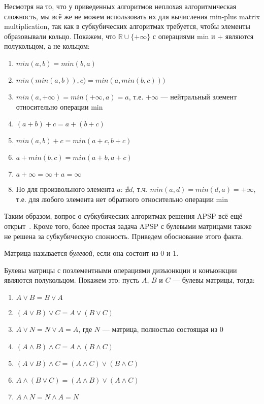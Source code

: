 Несмотря на то, что у приведенных алгоритмов неплохая алгоритмическая сложность, мы всё же не можем использовать их для вычисления min-plus matrix multiplication, так как в субкубических алгоритмах требуется, чтобы элементы образовывали кольцо. Покажем, что $\mathbb{R} \cup \{+\infty\}$ с операциями min и + являются полукольцом, а не кольцом:
\begin{enumerate}
    \item $min(a, b) = min(b, a)$
    \item $min(min(a, b)), c) = min(a, min(b, c)))$
    \item $min(a, +\infty) = min(+\infty, a) = a$, т.е. $+\infty$ --- нейтральный элемент относительно операции min

    \item $(a + b) + c = a + (b + c)$

    \item $min(a, b) + c = min(a + c, b + c)$
    \item $a + min(b, c) = min(a + b, a + c)$

    \item $a + \infty = \infty + a = \infty$
    \item Но для произвольного элемента $a$: $\nexists d$, т.ч. $min(a, d) = min(d, a) = +\infty$, т.е. для любого элемента нет обратного относительно операции min
\end{enumerate}

Таким образом, вопрос о субкубических алгоритмах решения APSP всё ещё открыт~\cite{Chan2010}.
Кроме того, более простая задача APSP с булевыми матрицами также не решена за субкубическую сложность. Приведем обоснование этого факта.

\begin{definition}
  Матрица называется \textit{булевой}, если она состоит из 0 и 1.
\end{definition}

Булевы матрицы с поэлементными операциями дизъюнкции и конъюнкции являются полукольцом. Покажем это: пусть $A$, $B$ и $C$ --- булевы матрицы, тогда:
\begin{enumerate}
    \item $A \vee B = B \vee A$
    \item $(A \vee B) \vee C = A \vee (B \vee C)$
    \item $A \vee N = N \vee A = A$, где $N$ --- матрица, полностью состоящая из 0

    \item $(A \wedge B) \wedge C = A \wedge (B \wedge C)$

    \item $(A \vee B) \wedge C = (A \wedge C) \vee (B \wedge C)$
    \item $A \wedge (B \vee C) = (A \wedge B) \vee (A \wedge C)$

    \item $A \wedge N = N \wedge A = N$
\end{enumerate}

